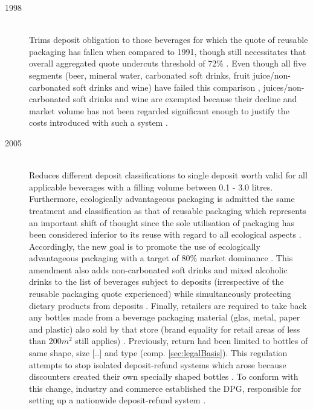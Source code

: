 \begin{description}
	\item[1998]
	\hfill \\
	Trims deposit obligation to those beverages for which the quote of reusable packaging has fallen when compared to 1991, though still necessitates that overall aggregated quote undercuts threshold of 72\% \cite[pp.~142]{Flanderka1999}. Even though all five segments (beer, mineral water, carbonated soft drinks, fruit juice/non-carbonated soft drinks and wine) have failed this comparison \cite[p.~1]{BMU2015}, juices/non-carbonated soft drinks and wine are exempted because their decline and market volume has not been regarded significant enough to justify the costs introduced with such a system  \cite[pp.~6,~9]{Hartlep2011Recycling}. 
	

	\item[2005]
	\hfill \\
	Reduces different deposit classifications to single deposit worth  valid for all applicable beverages with a filling volume between 0.1 - 3.0 litres. Furthermore, \gls{ecologically advantageous packaging} is admitted the same treatment and classification as that of reusable packaging which represents an important shift of thought since the sole utilisation of packaging has been considered inferior to its reuse with regard to all ecological aspects  \cite[p.~7]{Hartlep2011Recycling}. Accordingly, the new goal is to promote the use of ecologically advantageous packaging with a target of 80\% market dominance \cite[§~1]{verpackV2008}. This amendment also adds non-carbonated soft drinks and mixed alcoholic drinks to the list of beverages subject to deposits (irrespective of the reusable packaging quote experienced) while simultaneously protecting dietary products from deposits \cite[p.~1408]{verpackV2005} \cite[p.~171]{Flanderka/Stroetmann2009}. Finally, retailers are required to take back any bottles made from a beverage packaging material (glas, metal, paper and plastic) also sold by that store (brand equality for retail areas of less than 200$m^2$ still applies)  \cite[p.~11]{Hartlep2011Recycling}. Previously, return had been limited to bottles of same shape, size [..] and type (comp. \ref{sec:legalBasis}). This regulation attempts to stop isolated deposit-refund systems which arose because discounters created their own specially shaped bottles \cite[p.~168]{Flanderka/Stroetmann2009}. To conform with this change, industry and commerce established the \acl{DPG}, responsible for setting up a nationwide deposit-refund system  \cite[p.~8]{Hartlep2011Recycling}.
	

\end{description}
